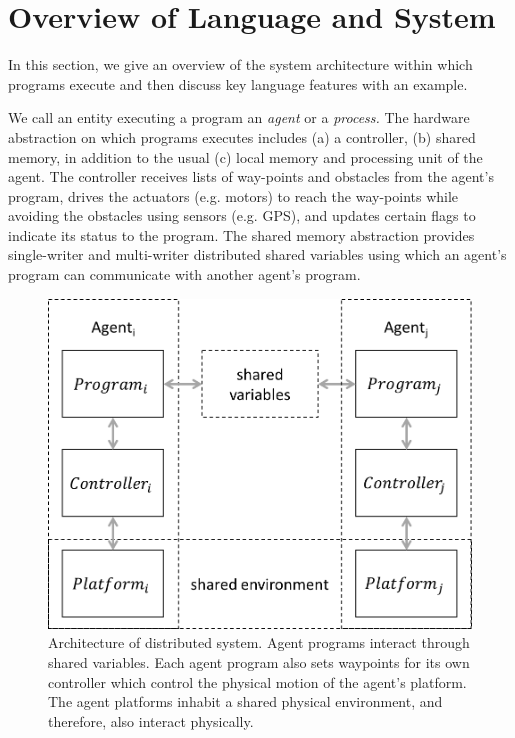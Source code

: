 \section{Overview of Language and System}
\label{sect:Overview}
In this section, we give an overview of the system architecture within which \rolang programs execute and then discuss key language features with an example.

We call an entity executing a \rolang program an {\em agent\/} or a {\em process.\/}
The hardware abstraction on which \rolang programs executes includes (a) a controller, (b) shared memory, in addition to the usual (c) local memory and processing unit of the agent.  
%
The controller receives lists of way-points and obstacles from the agent's program, drives the actuators (e.g. motors) to reach the way-points while avoiding the obstacles using sensors (e.g. GPS), and updates certain flags to indicate its status to the program.
%
The shared memory abstraction provides single-writer and multi-writer distributed shared variables using which an agent's program can communicate with another agent's program. 

\begin{figure}[t!]
	\centering
	\includegraphics[scale=0.4]{figs/arch.png}
	\caption{\small Architecture of distributed system. Agent programs interact through shared variables. Each agent program also sets waypoints for its own controller which control the physical motion of the agent's platform. The agent platforms inhabit a shared physical environment, and therefore, also interact physically.}
\end{figure}

